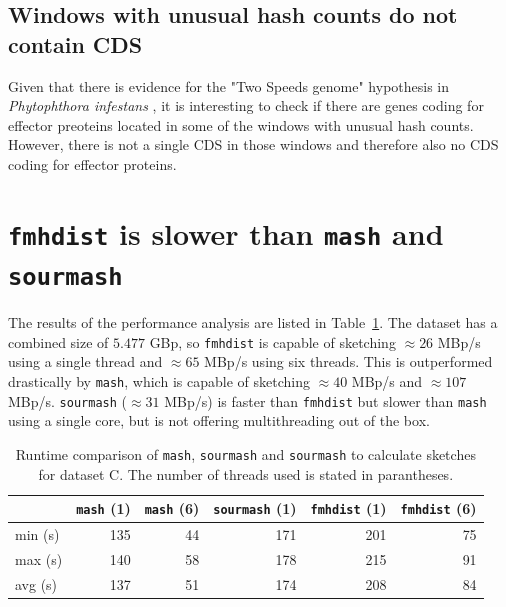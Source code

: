 \subsection*{Windows with unusual hash counts do not contain CDS}
Given that there is evidence for the "Two Speeds genome" hypothesis in
\textit{Phytophthora infestans} \cite{dongTwospeedGenomesFilamentous2015}, it is
interesting to check if there are genes coding for effector preoteins located in
some of the windows with unusual hash counts. However, there is not a single CDS
in those windows and therefore also no CDS coding for effector proteins.


\section{\texttt{fmhdist} is slower than \texttt{mash} and \texttt{sourmash}}
The results of the performance analysis are listed in
Table~\ref{ta:performance}. The dataset has a combined size of $5.477$ GBp,
so \texttt{fmhdist} is capable of sketching $\approx 26$ MBp/s using a single
thread and $\approx 65$ MBp/s using six threads. This is outperformed
drastically by \texttt{mash}, which is capable of sketching $\approx 40$ MBp/s
and $\approx 107$ MBp/s. \texttt{sourmash} ($\approx 31$ MBp/s) is faster than
\texttt{fmhdist} but slower than \texttt{mash} using a single core, but is not
offering multithreading out of the box. 

\begin{table}[]
  \centering
  \begin{tabular}{@{}lrrrrr@{}}
  \toprule
                  & \texttt{mash} (1)     & \texttt{mash} (6) & \texttt{sourmash} (1) & \texttt{fmhdist} (1) & \texttt{fmhdist} (6) \\ \midrule
  min (s) & 135                     &  44                     &  171              &  201                      & 75                         \\
  max (s) & 140                     &  58                     &  178              &  215                      & 91                         \\
  avg (s) & 137                     &  51                     &  174              &  208                      & 84                         \\ \bottomrule
  \end{tabular}
  \caption{Runtime comparison of \texttt{mash}, \texttt{sourmash} and
  \texttt{sourmash} to calculate sketches for dataset C. The number of threads used is stated in parantheses.}
  \label{ta:performance}
\end{table}

\clearpage
